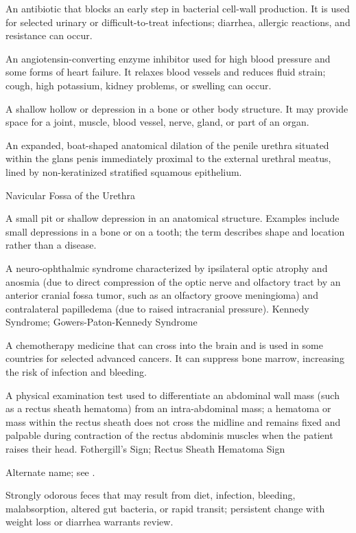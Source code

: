 An antibiotic that blocks an early step in bacterial cell-wall production. It is used for selected urinary or difficult-to-treat infections; diarrhea, allergic reactions, and resistance can occur.

 An angiotensin-converting enzyme inhibitor used for high blood pressure and some forms of heart failure. It relaxes blood vessels and reduces fluid strain; cough, high potassium, kidney problems, or swelling can occur.

 A shallow hollow or depression in a bone or other body structure. It may provide space for a joint, muscle, blood vessel, nerve, gland, or part of an organ.

 An expanded, boat-shaped anatomical dilation of the penile urethra situated within the glans penis immediately proximal to the external urethral meatus, lined by non-keratinized stratified squamous epithelium.

\synonyms
Navicular Fossa of the Urethra

 A small pit or shallow depression in an anatomical structure. Examples include small depressions in a bone or on a tooth; the term describes shape and location rather than a disease.

 A neuro-ophthalmic syndrome characterized by ipsilateral optic atrophy and anosmia (due to direct compression of the optic nerve and olfactory tract by an anterior cranial fossa tumor, such as an olfactory groove meningioma) and contralateral papilledema (due to raised intracranial pressure).
\synonyms
Kennedy Syndrome; Gowers-Paton-Kennedy Syndrome

 A chemotherapy medicine that can cross into the brain and is used in some countries for selected advanced cancers. It can suppress bone marrow, increasing the risk of infection and bleeding.

 A physical examination test used to differentiate an abdominal wall mass (such as a rectus sheath hematoma) from an intra-abdominal mass; a hematoma or mass within the rectus sheath does not cross the midline and remains fixed and palpable during contraction of the rectus abdominis muscles when the patient raises their head.
\synonyms
Fothergill's Sign; Rectus Sheath Hematoma Sign

 Alternate name; see .

 Strongly odorous feces that may result from diet, infection, bleeding, malabsorption, altered gut bacteria, or rapid transit; persistent change with weight loss or diarrhea warrants review.

